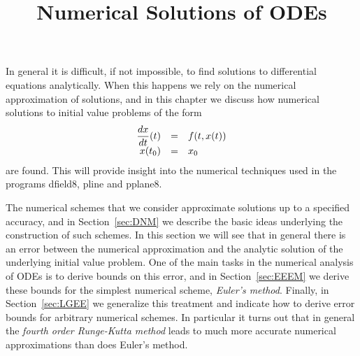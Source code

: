\documentclass{ximera}
\title{Numerical Solutions of ODEs}
\begin{document}
\begin{abstract}
\end{abstract}
\maketitle


\label{ch:NumSolODE}

\normalsize

In general it is difficult, if not impossible, to find solutions to 
differential equations analytically.   When this happens we rely on the
numerical approximation of solutions, and in this chapter we discuss 
how numerical solutions to initial value 
problems of the form
\arraystart
\[
\begin{array}{rcl}
\displaystyle\frac{dx}{dt}(t) & = & f(t,x(t)) \\
x(t_0) & = & x_0
\end{array}
\]
\arrayfinish
are found.  This will provide insight into the numerical
techniques used in the \Matlab programs {\sf dfield8},
{\sf pline} and {\sf pplane8}.

The numerical schemes that we consider approximate 
solutions up to a specified accuracy, and
in Section~\ref{sec:DNM} we describe the basic ideas
underlying the construction of such schemes.  In this
section we will see that in general there is an error between 
the numerical approximation and the analytic solution
of the underlying initial value problem.  One of the main
tasks in the numerical analysis of ODEs is to derive bounds
on this error, and in Section~\ref{sec:EEEM} we derive these bounds
for the simplest numerical scheme, {\em Euler's method}.  Finally, 
in Section~\ref{sec:LGEE}
we generalize this treatment and indicate how to derive error 
bounds for arbitrary numerical schemes.  In particular it
turns out that in general the {\em fourth order Runge-Kutta method\/}
leads to much more accurate numerical approximations than 
does Euler's method.
\end{document}
